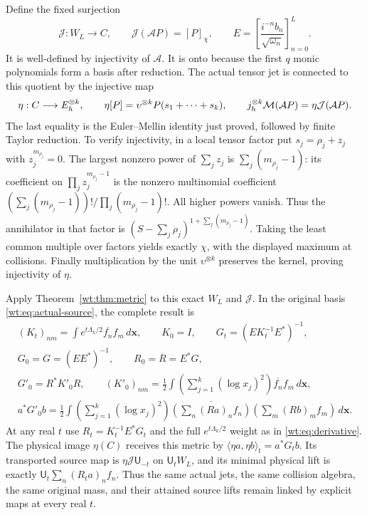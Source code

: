 Define the fixed surjection
\begin{equation}\label{wt:eq:actual-jet}
 \mathcal J:W_L\longrightarrow C,\qquad
 \mathcal J(\mathcal AP)=[P]_\chi,\qquad
 E=\left[\frac{i^{-n}b_n}{\sqrt{\omega_n}}\right]_{n=0}^L.
\end{equation}
It is well-defined by injectivity of $\mathcal A$.  It is onto
because the first $q$ monic polynomials form a basis after
reduction.  The actual tensor jet is connected to this quotient
by the injective map
\begin{equation}\label{wt:eq:eta}
 \eta:C\longrightarrow E_h^{\otimes k},\qquad
 \eta[P]=\upsilon^{\otimes k}P(s_1+\cdots+s_k),\qquad
 j_h^{\otimes k}\mathcal M(\mathcal AP)=\eta\mathcal J(\mathcal AP).
\end{equation}
The last equality is the Euler--Mellin identity just proved,
followed by finite Taylor reduction.  To verify injectivity,
in a local tensor factor put $s_j=\rho_j+z_j$ with
$z_j^{m_{\rho_j}}=0$.  The largest nonzero power of $\sum_jz_j$
is $\sum_j(m_{\rho_j}-1)$: its coefficient on
$\prod_jz_j^{m_{\rho_j}-1}$ is the nonzero multinomial
coefficient
$(\sum_j(m_{\rho_j}-1))!/\prod_j(m_{\rho_j}-1)!$.
All higher powers vanish.  Thus the annihilator in that factor
is $(S-\sum_j\rho_j)^{1+\sum_j(m_{\rho_j}-1)}$.
Taking the least common multiple over factors yields exactly
$\chi$, with the displayed maximum at collisions.  Finally
multiplication by the unit $\upsilon^{\otimes k}$ preserves
the kernel, proving injectivity of $\eta$.

Apply Theorem~\ref{wt:thm:metric} to this exact $W_L$ and
$\mathcal J$.  In the original basis \eqref{wt:eq:actual-source},
the complete result is
\begin{equation}\label{wt:eq:actual-derivative}
 \begin{gathered}
 (K_t)_{nm}=\int e^{t\Lambda_k/2}\overline{f_n}f_m\,d\mathbf x,
 \qquad K_0=I,\qquad
 G_t=(EK_t^{-1}E^*)^{-1},\\
 G_0=G=(EE^*)^{-1},\qquad R_0=R=E^*G,\\
 G'_0=R^*K'_0R,\qquad
 (K'_0)_{nm}=\frac12\int\left(\sum_{j=1}^k(\log x_j)^2\right)
                          \overline{f_n}f_m\,d\mathbf x,\\
 a^*G'_0b=\frac12\int\left(\sum_{j=1}^k(\log x_j)^2\right)
 \overline{\left(\sum_n(Ra)_nf_n\right)}
             \left(\sum_m(Rb)_mf_m\right)\,d\mathbf x.
 \end{gathered}
\end{equation}
At any real $t$ use $R_t=K_t^{-1}E^*G_t$ and the full
$e^{t\Lambda_k/2}$ weight as in \eqref{wt:eq:derivative}.
The physical image $\eta(C)$ receives this metric by
$\langle\eta a,\eta b\rangle_t=a^*G_tb$.  Its transported
source map is $\eta\mathcal J\mathsf U_{-t}$ on
$\mathsf U_tW_L$, and its minimal physical lift is exactly
$\mathsf U_t\sum_n(R_ta)_nf_n$.  Thus the same actual jets,
the same collision algebra, the same original mass, and their
attained source lifts remain linked by explicit maps at every
real $t$.

